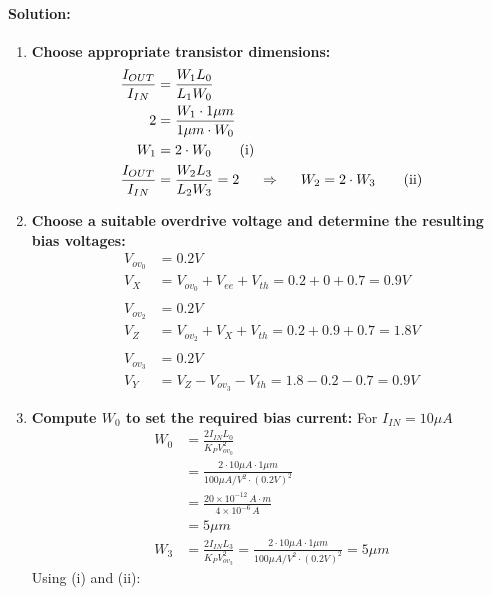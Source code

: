 \paragraph{Solution:}
\begin{enumerate}
  \item \textbf{Choose appropriate transistor dimensions:}
    \begin{align*}
      \frac{I_{OUT}}{I_{IN}} &= \frac{W_1 L_0}{L_1 W_0} \\
      2 &= \frac{W_1 \cdot 1 \mu m}{1 \mu m \cdot W_0} \\
      W_1 &= 2 \cdot W_0 \tag{i} \\
      \frac{I_{OUT}}{I_{IN}} &= \frac{W_2 L_3}{L_2 W_3} = 2
      \hspace{0.5cm} \Rightarrow \hspace{0.5cm} W_2 = 2 \cdot W_3 \tag{ii}
    \end{align*}
  \item \textbf{Choose a suitable overdrive voltage and determine
    the resulting bias voltages:}
    \begin{align*}
      V_{ov_0} &= 0.2 V \\
      V_{X} &= V_{ov_0} + V_{ee} + V_{th} = 0.2 + 0 + 0.7 = 0.9 V \\
      \\
      V_{ov_2} &= 0.2 V \\
      V_{Z} &= V_{ov_2} + V_{X} + V_{th} = 0.2 + 0.9 + 0.7 = 1.8 V \\
      \\
      V_{ov_3} &= 0.2 V \\
      V_{Y} &= V_{Z} - V_{ov_3} - V_{th} = 1.8 - 0.2 - 0.7 = 0.9 V
    \end{align*}
  \item \textbf{Compute $W_0$ to set the required bias current:} For $I_{IN} = 10 \mu A$
    \begin{align*}
      W_0 &= \frac{2 I_{IN} L_0}{K_P V_{ov_0}^2} \\
          &= \frac{2 \cdot 10 \mu A \cdot 1 \mu m}{100 \mu A/V^2 \cdot (0.2V)^2} \\
          &= \frac{20 \times 10^{-12} \, A \cdot m}{4 \times 10^{-6} \, A} \\
          &= 5 \mu m \\
      W_3 &= \frac{2 I_{IN} L_3}{K_P V_{ov_3}^2} = \frac{2 \cdot 10 \mu A \cdot 1 \mu m}{100 \mu A/V^2 \cdot (0.2V)^2} = 5 \mu m
    \end{align*}
    Using (i) and (ii):
    \begin{align*}

\end{align*}
\end{enumerate}
